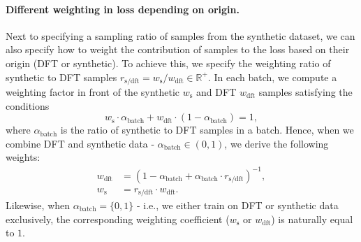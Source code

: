 \documentclass{article}
\begin{document}
\paragraph{Different weighting in loss depending on origin.}

Next to specifying a sampling ratio of samples from the synthetic dataset, we can also specify how to weight the contribution of samples to the loss based on their origin (DFT or synthetic). To achieve this, we specify the weighting ratio of synthetic to DFT samples $r_{\text{s/dft}} = w_{\text{s}}/w_{\text{dft}} \in \mathbb{R}^+$. In each batch, we compute a weighting factor in front of the synthetic $w_\text{s}$ and DFT $w_{\text{dft}}$ samples satisfying the conditions 
\begin{equation}
    w_\text{s} \cdot  \alpha_{\text{batch}} + w_{\text{dft}} \cdot (1-\alpha_{\text{batch}}) = 1,
\end{equation}
where $\alpha_{\text{batch}}$ is the ratio of synthetic to DFT samples in a batch. Hence, when we combine DFT and synthetic data - $\alpha_{\text{batch}} \in(0,1)$, we derive the following weights:
\begin{align}
  w_{\text{dft}}&=(1-\alpha_{\text{batch}}+\alpha_{\text{batch}} \cdot r_{\text{s/dft}})^{-1},\\
  w_{\text{s}}&=r_{\text{s/dft}} \cdot w_{\text{dft}}.
\end{align}
Likewise, when $\alpha_{\text{batch}}=\{0, 1\}$ - i.e., we either train on DFT or synthetic data exclusively, the corresponding weighting coefficient ($w_\text{s}$ or $w_{\text{dft}}$) is naturally equal to $1$.

\end{document}

